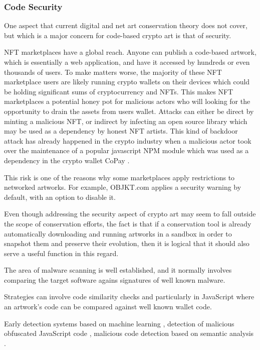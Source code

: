 \subsubsection{Code Security}
\label{sub:codesec}

One aspect that current digital and net art conservation theory does not cover, but which is a major concern for code-based crypto art is that of security.

NFT marketplaces have a global reach. Anyone can publish a code-based artwork, which is essentially a web application, and have it accessed by hundreds or even thousands of users. To make matters worse, the majority of these NFT marketplace users are likely running crypto wallets on their devices which could be holding significant sums of cryptocurrency and NFTs. This makes NFT marketplaces a potential honey pot for malicious actors who will looking for the opportunity to drain the assets from users wallet. Attacks can either be direct by minting a malicious NFT, or indirect by infecting an open source library which may be used as a dependency by honest NFT artists. This kind of backdoor attack has already happened in the crypto industry when a malicious actor took over the maintenance of a popular javascript NPM module which was used as a dependency in the crypto wallet CoPay \cite{haworthPopularJavaScriptDependency2018}.

This risk is one of the reasons why some marketplaces apply restrictions to networked artworks.
For example, OBJKT.com applies a security warning by default, with an option to disable it.

Even though addressing the security aspect of crypto art may seem to fall outside the scope of conservation efforts, the fact is that if a conservation tool is already automatically downloading and running artworks in a sandbox in order to snapshot them and preserve their evolution, then it is logical that it should also serve a useful function in this regard.

The area of malware scanning is well established, and it normally involves comparing the target software agains signatures of well known malware.


Strategies can involve code similarity checks \cite{ragkhitwetsagulComparisonCodeSimilarity2018} and particularly in JavaScript \cite{alfagehCloneDetectionTechniques2020} where an artwork's code can be compared against well known wallet code.


Early detection systems based on machine learning \cite{schuttEarlyDetectionMalicious2012}, detection of malicious obfuscated JavaScript code \cite{likarishObfuscatedMaliciousJavascript2009} \cite{fassJaStFullySyntactic2018}, malicious code detection based on semantic analysis \cite{fangDetectingMaliciousJavaScript2020}.


